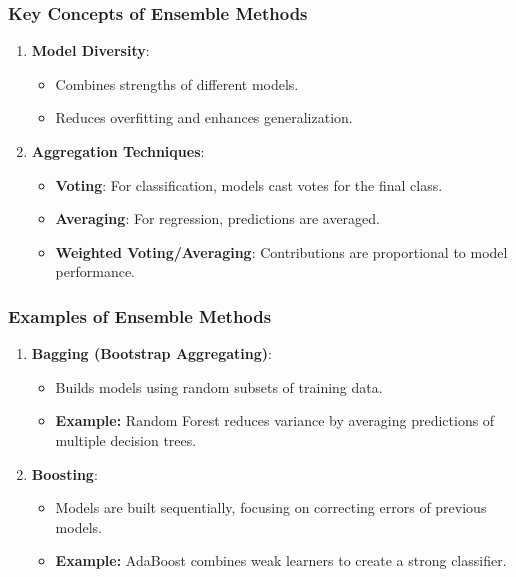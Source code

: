 \documentclass[aspectratio=169]{beamer}
\begin{document}
\begin{frame}[fragile]
    \frametitle{Key Concepts of Ensemble Methods}
    \begin{enumerate}
        \item \textbf{Model Diversity}:
        \begin{itemize}
            \item Combines strengths of different models.
            \item Reduces overfitting and enhances generalization.
        \end{itemize}
        
        \item \textbf{Aggregation Techniques}:
        \begin{itemize}
            \item \textbf{Voting}: For classification, models cast votes for the final class.
            \item \textbf{Averaging}: For regression, predictions are averaged.
            \item \textbf{Weighted Voting/Averaging}: Contributions are proportional to model performance.
        \end{itemize}
    \end{enumerate}
\end{frame}

\begin{frame}[fragile]
    \frametitle{Examples of Ensemble Methods}
    \begin{enumerate}
        \item \textbf{Bagging (Bootstrap Aggregating)}:
        \begin{itemize}
            \item Builds models using random subsets of training data.
            \item \textbf{Example:} Random Forest reduces variance by averaging predictions of multiple decision trees.
        \end{itemize}
        
        \item \textbf{Boosting}:
        \begin{itemize}
            \item Models are built sequentially, focusing on correcting errors of previous models.
            \item \textbf{Example:} AdaBoost combines weak learners to create a strong classifier.
        \end{itemize}
    \end{enumerate}
\end{frame}
\end{document}
